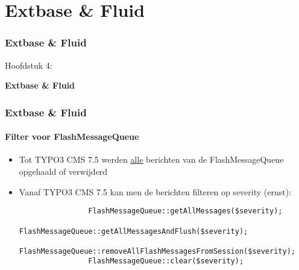 %

\section{Extbase \& Fluid}
\begin{frame}[fragile]
	\frametitle{Extbase \& Fluid}

	\begin{center}\huge{Hoofdstuk 4:}\end{center}
	\begin{center}\huge{\color{typo3darkgrey}\textbf{Extbase \& Fluid}}\end{center}

\end{frame}


\begin{frame}[fragile]
	\frametitle{Extbase \& Fluid}
	\framesubtitle{Filter voor FlashMessageQueue}

	\begin{itemize}

		\item Tot TYPO3 CMS 7.5 werden \underline{alle} berichten van de 
			FlashMessageQueue opgehaald of verwijderd

		\item Vanaf TYPO3 CMS 7.5 kan men de berichten filteren op severity (ernst):

			\begin{lstlisting}
				FlashMessageQueue::getAllMessages($severity);
				FlashMessageQueue::getAllMessagesAndFlush($severity);
				FlashMessageQueue::removeAllFlashMessagesFromSession($severity);
				FlashMessageQueue::clear($severity);
			\end{lstlisting}

	\end{itemize}

\end{frame}

